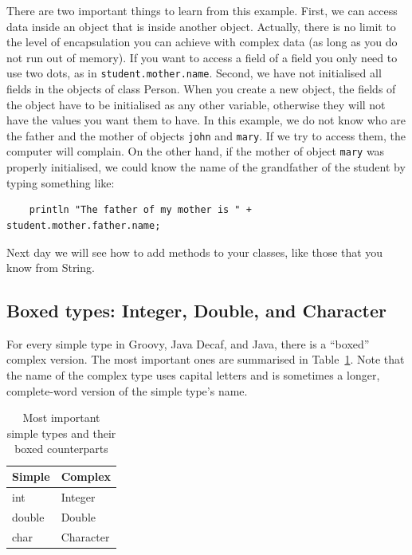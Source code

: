 There are two important things to learn from this example. First, we
can access data inside an object that is inside another object. 
Actually, there is no limit to the level of
encapsulation you can achieve with complex data (as long as you do not
run out of memory). If you want to access a field of a field you only
need to use two dots, as in \verb+student.mother.name+. 
Second, we
have not initialised all fields in the objects of class Person. When
you create a new object, the fields of the object have to be
initialised as any other variable, otherwise they will not have the
values you want them to have. In this example, we do not know who are
the father and the mother of objects \verb+john+ and \verb+mary+. If
we try to access them, the computer will complain. On the other hand,
if the mother of object \verb+mary+ was properly initialised, we could
know the name of the grandfather of the student by typing something
like: 

\begin{verbatim}
    println "The father of my mother is " + student.mother.father.name;
\end{verbatim}

Next day we will see how to add methods to your classes,
like those that you know from String. 

\subsection{Boxed types: Integer, Double, and Character}
\label{sec:boxed-types:-integer}

For every simple type in Groovy, Java Decaf, and Java, there is a ``boxed'' complex
version. The most important ones are summarised in
Table~\ref{tab:jajksdfj}. 
Note that the name of the complex type uses capital letters and is
sometimes a longer, complete-word version of the simple type's name. 

\begin{table}[htbp]
  \centering
  \begin{tabular}{|l|l|}
    \hline
    Simple & Complex \\
    \hline
    \hline
    int & Integer \\
    double & Double \\
    char & Character \\
    \hline
  \end{tabular}
  \caption{Most important simple types and their boxed counterparts}
  \label{tab:jajksdfj}
\end{table}


